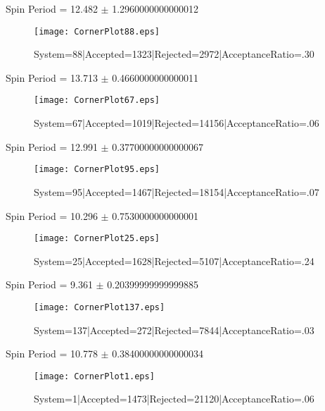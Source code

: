 \documentclass[10pt]{article}
\begin{document}
\begin{center}
        Spin Period = 12.482 $\pm$ 1.2960000000000012
        \end{center}
\begin{figure}[h] 
        \texttt{[image: CornerPlot88.eps]}
        \caption{System=88|Accepted=1323|Rejected=2972|AcceptanceRatio=.30}
        \label{S88}
        \centering
        \end{figure}
\begin{center}
        Spin Period = 13.713 $\pm$ 0.4660000000000011
        \end{center}
\begin{figure}[h] 
        \texttt{[image: CornerPlot67.eps]}
        \caption{System=67|Accepted=1019|Rejected=14156|AcceptanceRatio=.06}
        \label{S67}
        \centering
        \end{figure}
\begin{center}
        Spin Period = 12.991 $\pm$ 0.37700000000000067
        \end{center}
\begin{figure}[h] 
        \texttt{[image: CornerPlot95.eps]}
        \caption{System=95|Accepted=1467|Rejected=18154|AcceptanceRatio=.07}
        \label{S95}
        \centering
        \end{figure}
\begin{center}
        Spin Period = 10.296 $\pm$ 0.7530000000000001
        \end{center}
\begin{figure}[h] 
        \texttt{[image: CornerPlot25.eps]}
        \caption{System=25|Accepted=1628|Rejected=5107|AcceptanceRatio=.24}
        \label{S25}
        \centering
        \end{figure}
\begin{center}
        Spin Period = 9.361 $\pm$ 0.20399999999999885
        \end{center}
\begin{figure}[h] 
        \texttt{[image: CornerPlot137.eps]}
        \caption{System=137|Accepted=272|Rejected=7844|AcceptanceRatio=.03}
        \label{S137}
        \centering
        \end{figure}
\begin{center}
        Spin Period = 10.778 $\pm$ 0.38400000000000034
        \end{center}
\begin{figure}[h] 
        \texttt{[image: CornerPlot1.eps]}
        \caption{System=1|Accepted=1473|Rejected=21120|AcceptanceRatio=.06}
        \label{S1}
        \centering
        \end{figure}
\end{document}
